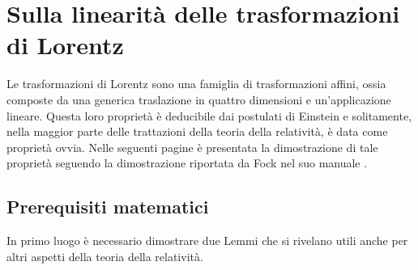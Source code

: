 \chapter{Sulla linearità delle trasformazioni di Lorentz}
\label{chap:LinearitàLorentz}
Le trasformazioni di Lorentz sono una famiglia di trasformazioni affini, ossia composte da una generica traslazione in quattro dimensioni e un'applicazione lineare. Questa loro proprietà è deducibile dai postulati di Einstein e solitamente, nella maggior parte delle trattazioni della teoria della relatività, è data come proprietà ovvia. Nelle seguenti pagine è presentata la dimostrazione di tale proprietà seguendo la dimostrazione riportata da Fock nel suo manuale \cite{Fock}.\\

\section{Prerequisiti matematici}
In primo luogo è necessario dimostrare due Lemmi che si rivelano utili anche per altri aspetti della teoria della relatività.


